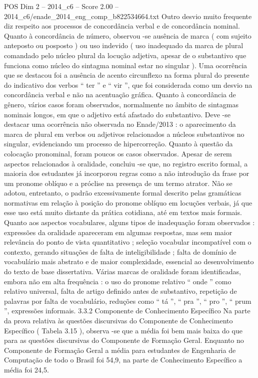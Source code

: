 \begin{textsample}{POS Dim 2 – 2014\_c6 – Score 2.00 – 2014\_c6/enade\_2014\_eng\_comp\_b822534664.txt}
Outro desvio muito frequente diz respeito aos processos de concordância verbal e de concordância nominal.
Quanto à concordância de número, observou -se ausência de marca ( com sujeito anteposto ou posposto ) ou uso indevido ( uso inadequado da marca de plural comandado pelo núcleo plural da locução adjetiva, apesar de o substantivo que funciona como núcleo do sintagma nominal estar no singular ).
Uma ocorrência que se destacou foi a ausência de acento circunflexo na forma plural do presente do indicativo dos verbos “ ter ” e “ vir ”, que foi considerada como um desvio na concordância verbal e não na acentuação gráfica.
Quanto à concordância de gênero, vários casos foram observados, normalmente no âmbito de sintagmas nominais longos, em que o adjetivo está afastado do substantivo.
Deve -se destacar uma ocorrência não observada no Enade/2013 : o aparecimento da marca de plural em verbos ou adjetivos relacionados a núcleos substantivos no singular, evidenciando um processo de hipercorreção.
Quanto à questão da colocação pronominal, foram poucos os casos observados.
Apesar de serem aspectos relacionados à oralidade, concluiu -se que, no registro escrito formal, a maioria dos estudantes já incorporou regras como a não introdução da frase por um pronome oblíquo e a próclise na presença de um termo atrator.
Não se adotou, entretanto, o padrão excessivamente formal descrito pelas gramáticas normativas em relação à posição do pronome oblíquo em locuções verbais, já que esse uso está muito distante da prática cotidiana, até em textos mais formais.
Quanto aos aspectos vocabulares, alguns tipos de inadequação foram observados : expressões da oralidade apareceram em algumas respostas, mas sem maior relevância do ponto de vista quantitativo ; seleção vocabular incompatível com o contexto, gerando situações de falta de inteligibilidade ; falta de domínio de vocabulário mais abstrato e de maior complexidade, essencial ao desenvolvimento do texto de base dissertativa.
Várias marcas de oralidade foram identificadas, embora não em alta frequência : o uso do pronome relativo “ onde ” como relativo universal, falta de artigo definido antes de substantivo, repetição de palavras por falta de vocabulário, reduções como “ tá ”, “ pra ”, “ pro ”, “ prum ”, expressões informais. 3.3.2 Componente de Conhecimento Específico Na parte da prova relativa às questões discursivas do Componente de Conhecimento Específico ( Tabela 3.15 ), observa -se que a média foi bem mais baixa do que para as questões discursivas do Componente de Formação Geral.
Enquanto no Componente de Formação Geral a média para estudantes de Engenharia de Computação de todo o Brasil foi 54,9, na parte de Conhecimento Específico a média foi 24,5.

\end{textsample}
